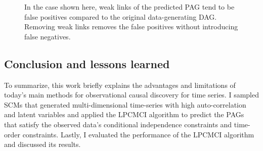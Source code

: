 \documentclass[conference]{IEEEtran}
\begin{document}
\begin{figure}[htbp]
    \centering
    \caption{In the case shown here, weak links of the predicted PAG tend to be false positives compared to the original data-generating DAG. Removing weak links removes the false positives without introducing false negatives.}
        \label{fig:removed}
\end{figure}


\subsection{Conclusion and lessons learned}

To summarize, this work briefly explains the advantages and limitations of today's main methods for observational causal discovery for time series. 
I sampled SCMs that generated multi-dimensional time-series with high auto-correlation and latent variables and applied the LPCMCI algorithm to predict the PAGs that satisfy the observed data's conditional independence constraints and time-order constraints. Lastly, I evaluated the performance of the LPCMCI algorithm and discussed its results. 
\end{document}
